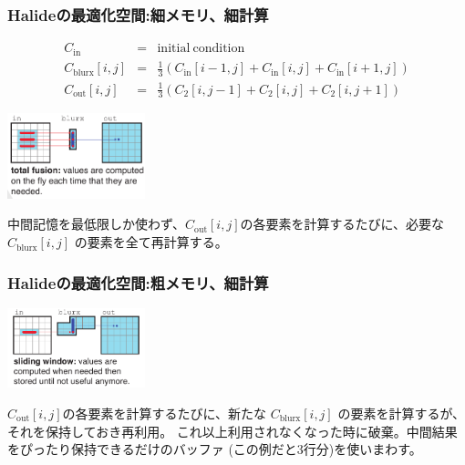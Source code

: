 \documentclass[dvipdfmx,cjk]{beamer}
\begin{document}
\begin{frame}\frametitle{Halideの最適化空間:細メモリ、細計算}

\begingroup \footnotesize
\begin{eqnarray*}
C_\mathrm{in} &=& \mathrm{initial~condition} \\
C_\mathrm{blurx} [i,j] &=& \frac{1}{3}\left(C_\mathrm{in}[i-1,j] + C_\mathrm{in}[i,j] + C_\mathrm{in}[i+1,j]\right) \\
C_\mathrm{out} [i,j] &=& \frac{1}{3}\left(C_\mathrm{2}[i,j-1] + C_\mathrm{2}[i,j] + C_\mathrm{2}[i,j+1]\right)
\end{eqnarray*}
\endgroup


\begin{center}
\includegraphics[width=4cm]{figure/doc/blur-fusion.png}
\end{center}

中間記憶を最低限しか使わず、$C_\mathrm{out} [i,j]$の各要素を計算するたびに、必要な$C_\mathrm{blurx} [i,j]$ の要素を全て再計算する。


\end{frame}

\begin{frame}\frametitle{Halideの最適化空間:粗メモリ、細計算}



\begin{center}
\includegraphics[width=4cm]{figure/doc/blur-sliding-window.png}
\end{center}

$C_\mathrm{out} [i,j]$の各要素を計算するたびに、新たな
$C_\mathrm{blurx} [i,j]$ の要素を計算するが、それを保持しておき再利用。
これ以上利用されなくなった時に破棄。中間結果をぴったり保持できるだけのバッファ
(この例だと3行分)を使いまわす。


\end{frame}
\end{document}
